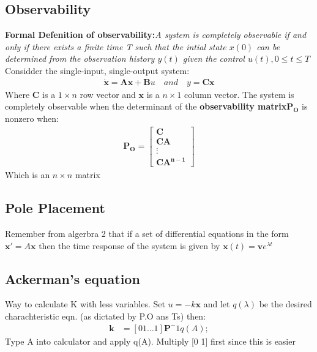 \documentclass{article}
\begin{document}
\subsection{Observability} %
\label{sub:observability}
{\bf Formal Defenition of observability:}\emph{A system is completely observable if and only if there exists a finite time T such that the intial state $x(0)$ can be determined from the observation history $y(t)$ given the control $u(t), 0 \leq t \leq T$}\\
Considder the single-input, single-output system:
\begin{align*}
\mathbf{\dot{x} = Ax +B}u \quad and \quad y = \mathbf{Cx}	
\end{align*}
Where $\mathbf{C}$ is a $1 \times n$ row vector and $\mathbf{x}$ is a $n \times 1$ column vector. The system is completely observable when the determinant of the {\bf observability matrix$\mathbf{P_O}$} is nonzero when:
\begin{align*}
\mathbf{P_O} = \left[ 	\begin{matrix}
 		\mathbf{C}\\\mathbf{CA}\\ \vdots \\\mathbf{CA^{n-1}}
 	\end{matrix}
 	\right]
 \end{align*} 
 Which is an $n \times n$ matrix



\subsection{Pole Placement} %
\label{sub:pole_placement}
Remember from algerbra 2 that if a set of differential equations in the form $\mathbf{x'} = A\mathbf{x}$ then the time response of the system is given by $\mathbf{x}(t) = \mathbf{v}e^{\lambda t}$
\subsection{Ackerman's equation} %
\label{sub:ackerman_s_equation}
Way to calculate K with less variables. Set $u = -k\mathbf{x}$ and let $q(\lambda)$ be the desired charachteristic eqn. (as dictated by P.O ans Ts) then:
\begin{align*}
	\mathbf{k} &= [0 1 \dots 1]\mathbf{P}^-1q(A);
\end{align*}
Type A into calculator and apply q(A). Multiply [0 1] first since this is easier
\end{document}
